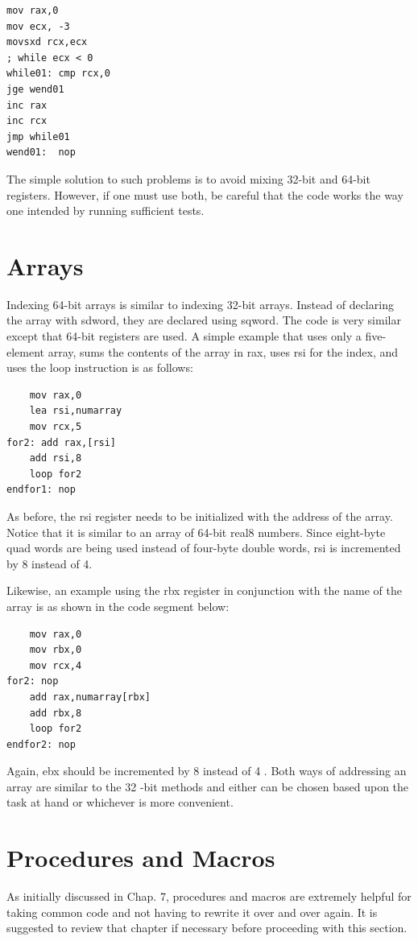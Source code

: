 \documentclass[10pt]{book}
\begin{document}
\begin{verbatim}
mov rax,0
mov ecx, -3
movsxd rcx,ecx
; while ecx < 0
while01: cmp rcx,0
jge wend01
inc rax
inc rcx
jmp while01
wend01:  nop
\end{verbatim}

The simple solution to such problems is to avoid mixing 32-bit and 64-bit registers. However, if one must use both, be careful that the code works the way one intended by running sufficient tests.

\section{Arrays}
Indexing 64-bit arrays is similar to indexing 32-bit arrays. Instead of declaring the array with sdword, they are declared using sqword. The code is very similar except that 64-bit registers are used. A simple example that uses only a five-element array, sums the contents of the array in rax, uses rsi for the index, and uses the loop instruction is as follows:
\begin{verbatim}
    mov rax,0
    lea rsi,numarray
    mov rcx,5
for2: add rax,[rsi]
    add rsi,8
    loop for2
endfor1: nop
\end{verbatim}

As before, the rsi register needs to be initialized with the address of the array. Notice that it is similar to an array of 64-bit real8 numbers. Since eight-byte quad words are being used instead of four-byte double words, rsi is incremented by 8 instead of 4.

Likewise, an example using the rbx register in conjunction with the name of the array is as shown in the code segment below:

\begin{verbatim}
    mov rax,0
    mov rbx,0
    mov rcx,4
for2: nop
    add rax,numarray[rbx]
    add rbx,8
    loop for2
endfor2: nop
\end{verbatim}

Again, ebx should be incremented by 8 instead of 4 . Both ways of addressing an array are similar to the 32 -bit methods and either can be chosen based upon the task at hand or whichever is more convenient.

\section{Procedures and Macros}
As initially discussed in Chap. 7, procedures and macros are extremely helpful for taking common code and not having to rewrite it over and over again. It is suggested to review that chapter if necessary before proceeding with this section.
\end{document}
